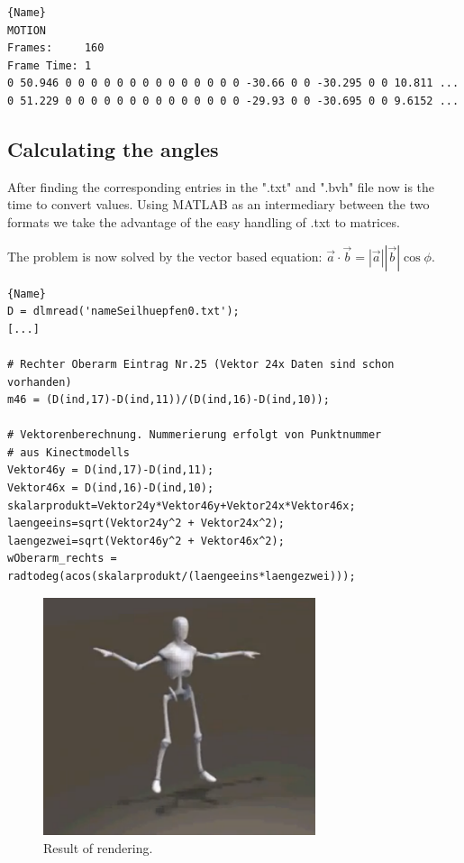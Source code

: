 \documentclass[a4paper]{article}
\begin{document}
\begin{lstlisting}[caption=Motionpart of .bvh]{Name}
MOTION
Frames:     160
Frame Time: 1                
0 50.946 0 0 0 0 0 0 0 0 0 0 0 0 0 0 -30.66 0 0 -30.295 0 0 10.811 ...
0 51.229 0 0 0 0 0 0 0 0 0 0 0 0 0 0 -29.93 0 0 -30.695 0 0 9.6152 ...
\end{lstlisting}

\subsection{Calculating the angles}

After finding the corresponding entries in the ".txt" and ".bvh" file now is the time to convert values.
Using MATLAB as an intermediary between the two formats we take the advantage of the easy handling of .txt to matrices.

The problem is now solved by the vector based equation: $\vec a \cdot \vec b = \left|\vec a \right| \left|\vec b \right| \cos \phi$.

\begin{lstlisting}[caption=Calculating the angle]{Name}
D = dlmread('nameSeilhuepfen0.txt');
[...]

# Rechter Oberarm Eintrag Nr.25 (Vektor 24x Daten sind schon vorhanden)
m46 = (D(ind,17)-D(ind,11))/(D(ind,16)-D(ind,10));

# Vektorenberechnung. Nummerierung erfolgt von Punktnummer 
# aus Kinectmodells
Vektor46y = D(ind,17)-D(ind,11);
Vektor46x = D(ind,16)-D(ind,10);
skalarprodukt=Vektor24y*Vektor46y+Vektor24x*Vektor46x;
laengeeins=sqrt(Vektor24y^2 + Vektor24x^2);
laengezwei=sqrt(Vektor46y^2 + Vektor46x^2); 
wOberarm_rechts = radtodeg(acos(skalarprodukt/(laengeeins*laengezwei)));
\end{lstlisting}

\begin{figure}
	\centering
	\includegraphics[width=8cm]{3dRender.PNG}
	\caption{Result of rendering.}
	\label{fig:3drender}
\end{figure}



\newpage

\end{document}

